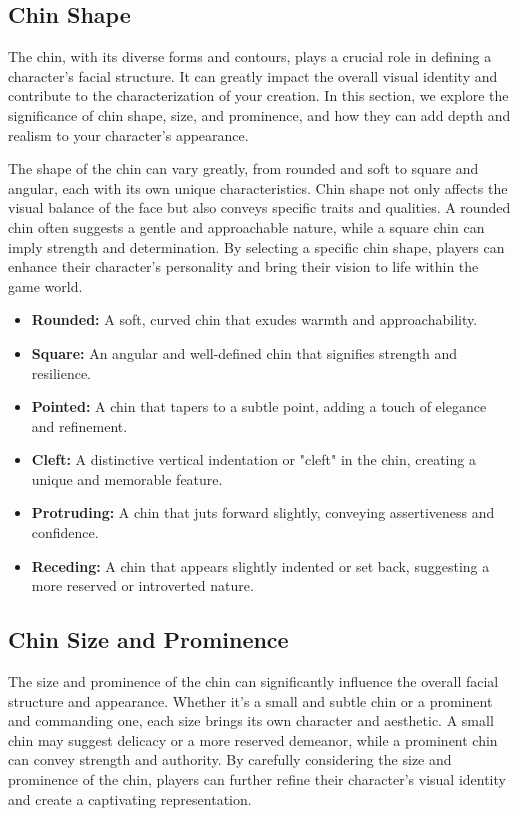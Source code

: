 \documentclass[12pt]{book}  %
\begin{document}
\subsection{\textbf{Chin Shape}}

The chin, with its diverse forms and contours, plays a crucial role in defining a character's facial structure. It can greatly impact the overall visual identity and contribute to the characterization of your creation. In this section, we explore the significance of chin shape, size, and prominence, and how they can add depth and realism to your character's appearance.

The shape of the chin can vary greatly, from rounded and soft to square and angular, each with its own unique characteristics. Chin shape not only affects the visual balance of the face but also conveys specific traits and qualities. A rounded chin often suggests a gentle and approachable nature, while a square chin can imply strength and determination. By selecting a specific chin shape, players can enhance their character's personality and bring their vision to life within the game world.

\begin{itemize}
    \item \textbf{Rounded:} A soft, curved chin that exudes warmth and approachability.
    \item \textbf{Square:} An angular and well-defined chin that signifies strength and resilience.
    \item \textbf{Pointed:} A chin that tapers to a subtle point, adding a touch of elegance and refinement.
    \item \textbf{Cleft:} A distinctive vertical indentation or "cleft" in the chin, creating a unique and memorable feature.
    \item \textbf{Protruding:} A chin that juts forward slightly, conveying assertiveness and confidence.
    \item \textbf{Receding:} A chin that appears slightly indented or set back, suggesting a more reserved or introverted nature.
\end{itemize}

\subsection{\textbf{Chin Size and Prominence}}

The size and prominence of the chin can significantly influence the overall facial structure and appearance. Whether it's a small and subtle chin or a prominent and commanding one, each size brings its own character and aesthetic. A small chin may suggest delicacy or a more reserved demeanor, while a prominent chin can convey strength and authority. By carefully considering the size and prominence of the chin, players can further refine their character's visual identity and create a captivating representation.
\end{document}
